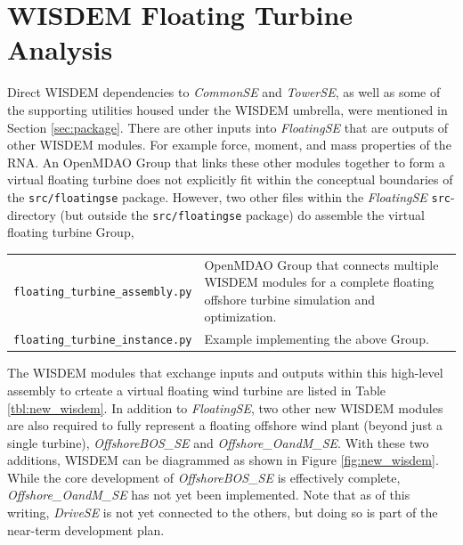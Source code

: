 
\chapter{WISDEM Floating Turbine Analysis}
\label{sec:other}
Direct WISDEM dependencies to \textit{CommonSE} and \textit{TowerSE}, as well as some of the
supporting utilities housed under the WISDEM umbrella, were mentioned in
Section \ref{sec:package}.  There are other inputs into \textit{FloatingSE} that
are outputs of other WISDEM modules.  For example force, moment, and
mass properties of the RNA.  An OpenMDAO Group that links these other
modules together to form a virtual floating turbine does not explicitly
fit within the conceptual boundaries of the \texttt{src/floatingse} package.
However, two other files within the \textit{FloatingSE} \texttt{src}-directory
(but outside the \texttt{src/floatingse} package) do assemble the virtual
floating turbine Group,

{\small
\begin{tabularx}{\textwidth}{ l X }
\texttt{floating\_turbine\_assembly.py} & OpenMDAO Group that connects  multiple WISDEM modules for a complete floating offshore turbine simulation and optimization.\\
\texttt{floating\_turbine\_instance.py} & Example implementing the above Group.
\end{tabularx}
}

The WISDEM modules that exchange inputs and outputs within this
high-level assembly to crteate a virtual floating wind turbine are
listed in Table \ref{tbl:new_wisdem}.  In addition to
\textit{FloatingSE}, two other new WISDEM modules are also required to
fully represent a floating offshore wind plant (beyond just a single
turbine), \textit{OffshoreBOS\_SE} and \textit{Offshore\_OandM\_SE}.
With these two additions, WISDEM can be diagrammed as shown in Figure
\ref{fig:new_wisdem}.  While the core development of
\textit{OffshoreBOS\_SE} is effectively complete,
\textit{Offshore\_OandM\_SE} has not yet been implemented. Note that as
of this writing, \textit{DriveSE} is not yet connected to the others,
but doing so is part of the near-term development plan.

